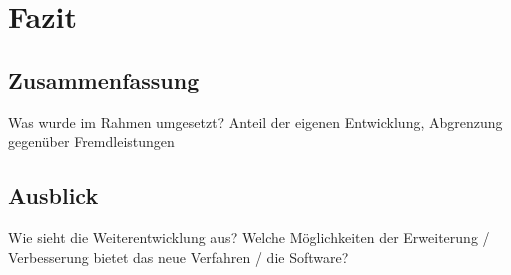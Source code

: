 \chapter{Fazit}
\section{Zusammenfassung}
Was wurde im Rahmen umgesetzt? Anteil der eigenen Entwicklung, Abgrenzung gegenüber Fremdleistungen

\section{Ausblick}
Wie sieht die Weiterentwicklung aus? Welche Möglichkeiten der Erweiterung / Verbesserung bietet das neue Verfahren / die Software?